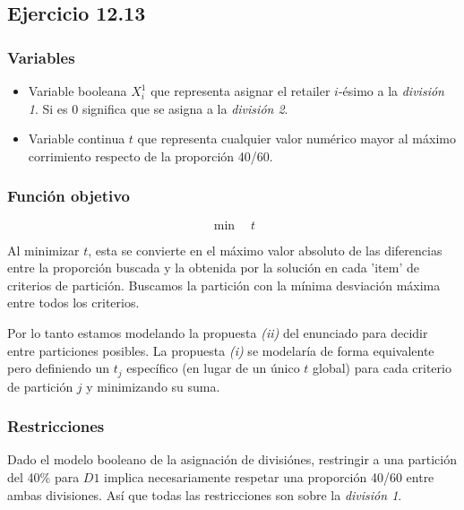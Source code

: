 \subsection{Ejercicio 12.13}

\subsubsection{Variables}
\begin{itemize}
    \item Variable booleana $X^1_i$ que representa asignar el retailer $i$-ésimo a la \emph{división 1}. Si es 0 significa que se asigna a la \emph{división 2}.
    \item Variable continua $t$ que representa cualquier valor numérico mayor al máximo corrimiento respecto de la proporción 40/60.
\end{itemize}
\subsubsection{Función objetivo}
$$ \min \quad t $$

Al minimizar $t$, esta se convierte en el máximo valor absoluto de las diferencias entre la proporción buscada y la obtenida por la solución en cada 'item' de criterios de partición. Buscamos la partición con la mínima desviación máxima entre todos los criterios.

Por lo tanto estamos modelando la propuesta \emph{(ii)} del enunciado para decidir entre particiones posibles. La propuesta \emph{(i)} se modelaría de forma equivalente pero definiendo un $t_j$ específico (en lugar de un único $t$ global) para cada criterio de partición $j$ y minimizando su suma.

\subsubsection{Restricciones}
Dado el modelo booleano de la asignación de divisiónes, restringir a una partición del 40\% para $D1$ implica necesariamente respetar una proporción 40/60 entre ambas divisiones. Así que todas las restricciones son sobre la \emph{división 1}.

